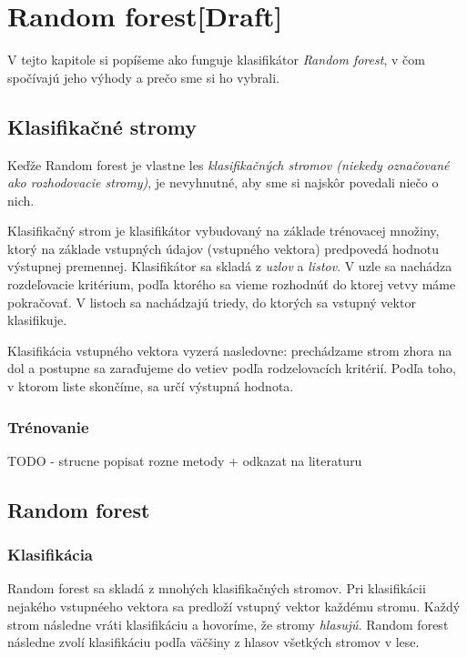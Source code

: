 \chapter{Random forest[Draft]}

V tejto kapitole si popíšeme ako funguje klasifikátor \textit{Random forest}, v čom spočívajú jeho výhody a prečo sme si ho vybrali.

\section{Klasifikačné stromy}
Keďže Random forest je vlastne les \textit{klasifikačných stromov (niekedy označované ako rozhodovacie stromy)}, je nevyhnutné, aby sme si najskôr povedali niečo o nich.

Klasifikačný strom je klasifikátor vybudovaný na základe trénovacej množiny, ktorý na základe vstupných údajov (vstupného vektora) predpovedá hodnotu výstupnej premennej. Klasifikátor sa skladá z \textit{uzlov} a \textit{listov}. V uzle sa nachádza rozdeľovacie kritérium, podľa ktorého sa vieme rozhodnúť do ktorej vetvy máme pokračovať. V listoch sa nachádzajú triedy, do ktorých sa vstupný vektor klasifikuje.

Klasifikácia vstupného vektora vyzerá nasledovne: prechádzame strom zhora na dol a postupne sa zaraďujeme do vetiev podľa rodzelovacích kritérií. Podľa toho, v ktorom liste skončíme, sa určí výstupná hodnota.

\subsection{Trénovanie}
TODO - strucne popisat rozne metody + odkazat na literaturu

\section{Random forest}

\subsection{Klasifikácia}
Random forest sa skladá z mnohých klasifikačných stromov. Pri klasifikácii nejakého vstupnéeho vektora sa predloží vstupný vektor každému stromu. Každý strom následne vráti klasifikáciu a hovoríme, že stromy \textit{hlasujú}. Random forest následne zvolí klasifikáciu podľa väčšiny z hlasov všetkých stromov v lese.

